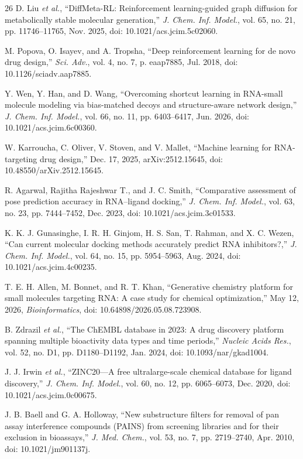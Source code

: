 \documentclass[journal]{IEEEtran}
\begin{document}
\begin{thebibliography}{26}
D. Liu \emph{et al.}, ``DiffMeta-RL: Reinforcement learning-guided graph
diffusion for metabolically stable molecular generation,'' \emph{J.
Chem. Inf. Model.}, vol. 65, no. 21, pp. 11746--11765, Nov. 2025, doi:
10.1021/acs.jcim.5c02060.

M. Popova, O. Isayev, and A. Tropsha, ``Deep reinforcement learning for
de novo drug design,'' \emph{Sci. Adv.}, vol. 4, no. 7, p. eaap7885,
Jul. 2018, doi: 10.1126/sciadv.aap7885.

Y. Wen, Y. Han, and D. Wang, ``Overcoming shortcut learning in
RNA-small molecule modeling via bias-matched decoys and structure-aware
network design,'' \emph{J. Chem. Inf. Model.}, vol. 66, no. 11,
pp. 6403--6417, Jun. 2026, doi: 10.1021/acs.jcim.6c00360.

W. Karroucha, C. Oliver, V. Stoven, and V. Mallet, ``Machine learning
for RNA-targeting drug design,'' Dec. 17, 2025, arXiv:2512.15645, doi:
10.48550/arXiv.2512.15645.

R. Agarwal, Rajitha Rajeshwar T., and J. C. Smith, ``Comparative
assessment of pose
prediction accuracy in RNA--ligand docking,'' \emph{J. Chem. Inf.
Model.}, vol. 63, no. 23, pp. 7444--7452, Dec. 2023, doi:
10.1021/acs.jcim.3c01533.

K. K. J. Gunasinghe, I. R. H. Ginjom, H. S. San, T. Rahman, and X. C.
Wezen, ``Can current molecular docking methods accurately predict RNA
inhibitors?,'' \emph{J. Chem. Inf. Model.}, vol. 64, no. 15,
pp. 5954--5963, Aug. 2024, doi: 10.1021/acs.jcim.4c00235.

T. E. H. Allen, M. Bonnet, and R. T. Khan, ``Generative chemistry
platform for small molecules targeting RNA: A case study for chemical
optimization,'' May 12, 2026, \emph{Bioinformatics}, doi:
10.64898/2026.05.08.723908.

B. Zdrazil \emph{et al.}, ``The ChEMBL database in 2023: A drug
discovery platform spanning multiple bioactivity data types and time
periods,'' \emph{Nucleic Acids Res.}, vol. 52, no. D1,
pp. D1180--D1192, Jan. 2024, doi: 10.1093/nar/gkad1004.

J. J. Irwin \emph{et al.}, ``ZINC20---A free ultralarge-scale chemical
database for ligand discovery,'' \emph{J. Chem. Inf. Model.}, vol. 60,
no. 12, pp. 6065--6073, Dec. 2020, doi: 10.1021/acs.jcim.0c00675.

J. B. Baell and G. A. Holloway, ``New substructure filters for removal
of pan assay interference compounds (PAINS) from screening libraries and
for their exclusion in bioassays,'' \emph{J. Med. Chem.}, vol. 53,
no. 7, pp. 2719--2740, Apr. 2010, doi: 10.1021/jm901137j.


\end{thebibliography}
\end{document}
